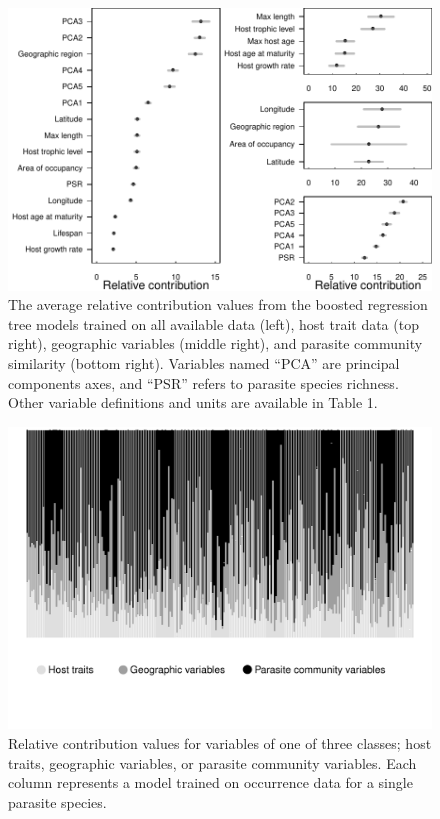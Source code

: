 \documentclass[12pt]{article}
\begin{document}
\newpage
 \begin{figure}[h!]
  \includegraphics[width=\textwidth]{Figures/megaBRT.pdf}
  \caption{The average relative contribution values from the boosted regression tree models trained on all available data (left), host trait data (top right), geographic variables (middle right), and parasite community similarity (bottom right). Variables named ``PCA'' are principal components axes, and ``PSR'' refers to parasite species richness. Other variable definitions and units are available in Table 1. }
 \label{fig:megaBRT}
 \end{figure}

 
 \newpage
 \begin{figure}[h!]
  \includegraphics[width=\textwidth]{Figures/allDataColorGS.pdf}
  \caption{Relative contribution values for variables of one of three classes; host traits, geographic variables, or parasite community variables. Each column represents a model trained on occurrence data for a single parasite species.}
 \label{fig:allDataBar}
 \end{figure}


 
 
\end{document}
